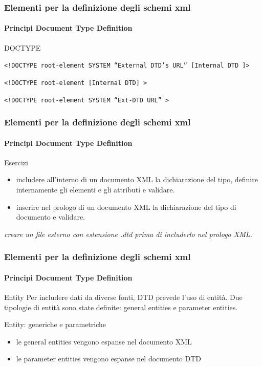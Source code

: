 \begin{frame}
    \frametitle{Elementi per la definizione degli schemi xml}
    \framesubtitle{Principi Document Type Definition}
    \addtocounter{nframe}{1}

    \begin{block}{DOCTYPE}
    \begin{center}\texttt{<!DOCTYPE root-element SYSTEM ``External DTD’s URL'' [Internal DTD ]>}\end{center}
    \begin{center}\texttt{<!DOCTYPE root-element [Internal DTD] >}\end{center}
    \begin{center}\texttt{<!DOCTYPE root-element SYSTEM ``Ext-DTD URL'' >}\end{center}
        
    \end{block}


\end{frame}

\begin{frame}
    \frametitle{Elementi per la definizione degli schemi xml}
    \framesubtitle{Principi Document Type Definition}
    \addtocounter{nframe}{1}

    \begin{block}{Esercizi}
    \begin{itemize}
        \item includere all'interno di un documento XML la dichiarazione del tipo, definire internamente gli elementi e gli attributi e validare.
        \item inserire nel prologo di un documento XML la dichiarazione del tipo di documento e validare.
    \end{itemize}
    \end{block}

    \textit{creare un file esterno con estensione .dtd prima di includerlo nel prologo XML.}

\end{frame}

\begin{frame}
    \frametitle{Elementi per la definizione degli schemi xml}
    \framesubtitle{Principi Document Type Definition}
    \addtocounter{nframe}{1}

    \begin{block}{Entity}
        Per includere dati da diverse fonti, DTD prevede l'uso di entità. Due tipologie di entità sono state definite: general entities e parameter entities.
    \end{block}

    \begin{block}{Entity: generiche e parametriche}
    \begin{itemize}
        \item le general entities vengono espanse nel documento XML
        \item le parameter entities vengono espanse nel documento DTD
    \end{itemize}
    \end{block}
    
\end{frame}

